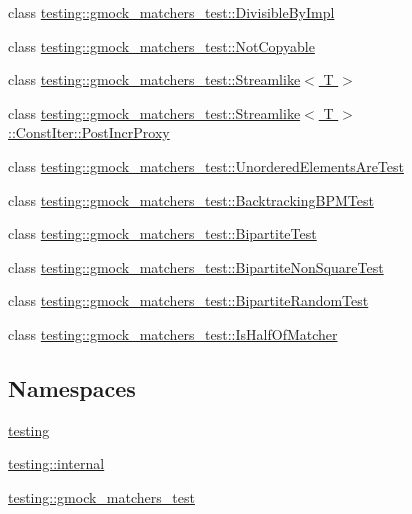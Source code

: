 \begin{DoxyCompactItemize}
\item 
class \hyperlink{classtesting_1_1gmock__matchers__test_1_1DivisibleByImpl}{testing\+::gmock\+\_\+matchers\+\_\+test\+::\+Divisible\+By\+Impl}
\item 
class \hyperlink{classtesting_1_1gmock__matchers__test_1_1NotCopyable}{testing\+::gmock\+\_\+matchers\+\_\+test\+::\+Not\+Copyable}
\item 
class \hyperlink{classtesting_1_1gmock__matchers__test_1_1Streamlike}{testing\+::gmock\+\_\+matchers\+\_\+test\+::\+Streamlike$<$ T $>$}
\item 
class \hyperlink{classtesting_1_1gmock__matchers__test_1_1Streamlike_1_1ConstIter_1_1PostIncrProxy}{testing\+::gmock\+\_\+matchers\+\_\+test\+::\+Streamlike$<$ T $>$\+::\+Const\+Iter\+::\+Post\+Incr\+Proxy}
\item 
class \hyperlink{classtesting_1_1gmock__matchers__test_1_1UnorderedElementsAreTest}{testing\+::gmock\+\_\+matchers\+\_\+test\+::\+Unordered\+Elements\+Are\+Test}
\item 
class \hyperlink{classtesting_1_1gmock__matchers__test_1_1BacktrackingBPMTest}{testing\+::gmock\+\_\+matchers\+\_\+test\+::\+Backtracking\+B\+P\+M\+Test}
\item 
class \hyperlink{classtesting_1_1gmock__matchers__test_1_1BipartiteTest}{testing\+::gmock\+\_\+matchers\+\_\+test\+::\+Bipartite\+Test}
\item 
class \hyperlink{classtesting_1_1gmock__matchers__test_1_1BipartiteNonSquareTest}{testing\+::gmock\+\_\+matchers\+\_\+test\+::\+Bipartite\+Non\+Square\+Test}
\item 
class \hyperlink{classtesting_1_1gmock__matchers__test_1_1BipartiteRandomTest}{testing\+::gmock\+\_\+matchers\+\_\+test\+::\+Bipartite\+Random\+Test}
\item 
class \hyperlink{classtesting_1_1gmock__matchers__test_1_1IsHalfOfMatcher}{testing\+::gmock\+\_\+matchers\+\_\+test\+::\+Is\+Half\+Of\+Matcher}
\end{DoxyCompactItemize}
\subsection*{Namespaces}
\begin{DoxyCompactItemize}
\item 
 \hyperlink{namespacetesting}{testing}
\item 
 \hyperlink{namespacetesting_1_1internal}{testing\+::internal}
\item 
 \hyperlink{namespacetesting_1_1gmock__matchers__test}{testing\+::gmock\+\_\+matchers\+\_\+test}
\end{DoxyCompactItemize}
